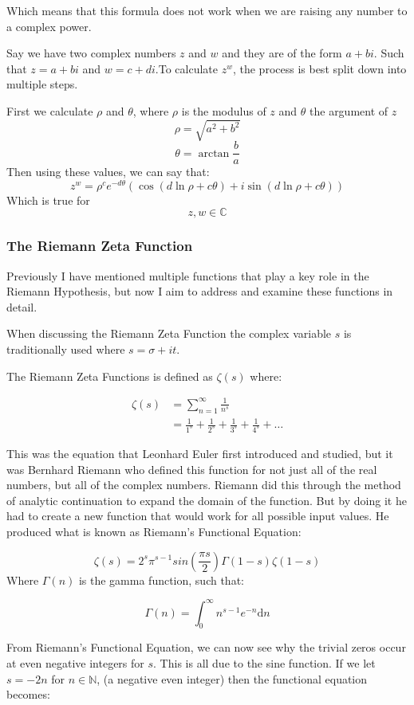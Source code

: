 \documentclass[12pt]{article}
\begin{document}
Which means that this formula does not work when we are raising any number to a complex power.

Say we have two complex numbers $z$ and $w$  and they are of the form $a+bi$. Such that $z=a+bi$ and $w=c+di$.To calculate $z^w$, the process is best split down into multiple steps.

First we calculate $\rho$ and $\theta$, where $\rho$ is the modulus of $z$ and $\theta$ the argument of $z$
$$\rho = \sqrt{a^2 + b^2}$$
$$\theta = \arctan{\frac{b}{a}}$$
Then using these values, we can say that:
$$z^w = \rho^c e^{-d\theta}(\cos(d \ln \rho + c\theta) + i \sin(d \ln \rho + c\theta))$$
Which is true for
$$z, w \in \mathbb{C}$$


\subsubsection{The Riemann Zeta Function}

Previously I have mentioned multiple functions that play a key role in the Riemann Hypothesis, but now I aim to address and examine these functions in detail.

When discussing the Riemann Zeta Function the complex variable $s$ is traditionally used where $s =\sigma  + it$.

The Riemann Zeta Functions is defined as $\zeta(s)$ where:

\begin{align*}
    \zeta(s) &= \sum_{n=1}^{\infty} \frac{1}{n^s}\\
    &= \frac{1}{1^s} + \frac{1}{2^s} + \frac{1}{3^s} + \frac{1}{4^s} + \dots
\end{align*}

This was the equation that Leonhard Euler first introduced and studied, but it was Bernhard Riemann who defined this function for not just all of the real numbers, but all of the complex numbers. Riemann did this through the method of analytic continuation to expand the domain of the function. But by doing it he had to create a new function that would work for all possible input values. He produced what is known as Riemann's Functional Equation:

$$\zeta(s) = 2^s\pi^{s-1}sin\left(\frac{\pi s}{2}\right)\Gamma(1-s)\zeta(1-s) $$
Where $\Gamma(n)$ is the gamma function, such that:

$$\Gamma(n) = \int_{0}^{\infty}n^{s-1}e^{-n} \mathrm{d}n$$

From Riemann's Functional Equation, we can now see why the trivial zeros occur at even negative integers for $s$. This is all due to the sine function. If we let $s = -2n$ for $n \in \mathbb{N}$, (a negative even integer) then the functional equation becomes:
\end{document}
